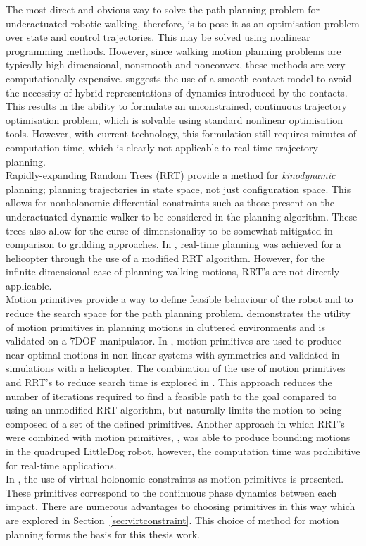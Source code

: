 The most direct and obvious way to solve the path planning problem for underactuated robotic walking, therefore, is to pose it as an optimisation problem over state and control trajectories. This may be solved using nonlinear programming methods. However, since walking motion planning problems are typically high-dimensional, nonsmooth and nonconvex, these methods are very computationally expensive. \cite{tassa2012synthesis} suggests the use of a smooth contact model to avoid the necessity of hybrid representations of dynamics introduced by the contacts. This results in the ability to formulate an unconstrained, continuous trajectory optimisation problem, which is solvable using standard nonlinear optimisation tools. However, with current technology, this formulation still requires minutes of computation time, which is clearly not applicable to real-time trajectory planning. \\

Rapidly-expanding Random Trees (RRT) \cite{lavalle2001randomized} provide a method for \textit{kinodynamic} planning; planning trajectories in state space, not just configuration space. This allows for nonholonomic differential constraints such as those present on the underactuated dynamic walker to be considered in the planning algorithm. These trees also allow for the curse of dimensionality to be somewhat mitigated in comparison to gridding approaches. In \cite{frazzoli2002real}, real-time planning was achieved for a helicopter through the use of a modified RRT algorithm. However, for the infinite-dimensional case of planning walking motions, RRT's are not directly applicable. \\

Motion primitives provide a way to define feasible behaviour of the robot and to reduce the search space for the path planning problem. \cite{cohen2011planning} demonstrates the utility of motion primitives in planning motions in cluttered environments and is validated on a 7DOF manipulator. In \cite{frazzoli2005maneuver}, motion primitives are used to produce near-optimal motions in non-linear systems with symmetries and validated in simulations with a helicopter. The combination of the use of motion primitives and RRT's to reduce search time is explored in \cite{vonasek2013global}. This approach reduces the number of iterations required to find a feasible path to the goal compared to using an unmodified RRT algorithm, but naturally limits the motion to being composed of a set of the defined primitives. Another approach in which RRT's were combined with motion primitives, \cite{shkolnik2011bounding}, was able to produce bounding motions in the quadruped LittleDog robot, however, the computation time was prohibitive for real-time applications. \\

In \cite{manchester13planning}, the use of virtual holonomic constraints as motion primitives is presented. These primitives correspond to the continuous phase dynamics between each impact. There are numerous advantages to choosing primitives in this way which are explored in Section~\ref{sec:virtconstraint}. This choice of method for motion planning forms the basis for this thesis work.